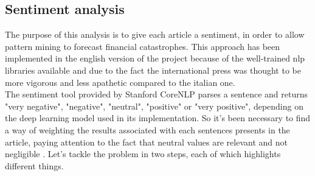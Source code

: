 \subsection{Sentiment analysis}
The purpose of this analysis is to give each article a sentiment, in order to allow pattern mining to forecast financial catastrophes. This approach has been implemented in the english version of the project because of the well-trained nlp libraries available and due to the fact the international press was thought to be more vigorous and less apathetic compared to the italian one. \\
The sentiment tool provided by Stanford CoreNLP parses a sentence and returns "very negative", "negative", "neutral", "positive" or "very positive", depending on the deep learning model \cite{sentimentdeep} used in its implementation. So it's been necessary to find a way of weighting the results associated with each sentences presents in the article, paying attention to the fact that neutral values are relevant and not negligible \cite{neutralvalues}. Let's tackle the problem in two steps, each of which highlights different things.
